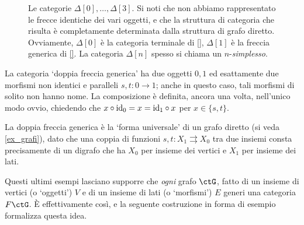 \begin{example}
\begin{figure}[h]
\begin{center}
		\end{center}
			\caption{Le categorie $\Delta[0], \dots,\Delta[3]$. Si noti che non abbiamo rappresentato le frecce identiche dei vari oggetti, e che la struttura di categoria che risulta è completamente determinata dalla struttura di grafo diretto. Ovviamente, $\Delta[0]$ è la categoria terminale di \ref{}, $\Delta[1]$ è la freccia generica di \ref{}. La categoria $\Delta[n]$ spesso si chiama un $n$-\emph{simplesso}.}
	\end{figure}
\end{example}
\begin{example}\label{ex_cat_doppiafreccia}
	La categoria `doppia freccia generica' ha due oggetti $0,1$ ed esattamente due morfismi non identici e paralleli $s,t : 0\to 1$; anche in questo caso, tali morfismi di solito non hanno nome. La composizione è definita, ancora una volta, nell'unico modo ovvio, chiedendo che $x\circ \mathrm{id}_0=x=\mathrm{id}_1\circ x$ per $x\in\{s,t\}$.

	La doppia freccia generica è la `forma universale' di un grafo diretto (si veda \ref{ex_grafi}), dato che una coppia di funzioni $s,t: X_1 \rightrightarrows X_0$ tra due insiemi consta precisamente di un digrafo che ha $X_0$ per insieme dei vertici e $X_1$ per insieme dei lati.
\end{example}
\begin{example}\label{ex_quadcuboncubo}
\end{example}
\begin{example}\label{ex_spancospan}
\end{example}
Questi ultimi esempi lasciano supporre che \emph{ogni} grafo \(\ctG\), fatto di un insieme di vertici (o `oggetti') \(V\) e di un insieme di lati (o `morfismi') \(E\) generi una categoria \(F\ctG\). \`E effettivamente così, e la seguente costruzione in forma di esempio formalizza questa idea.

